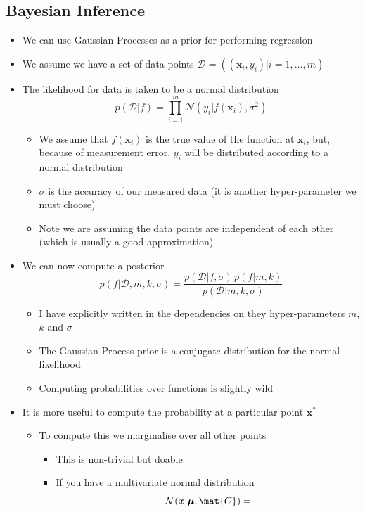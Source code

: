 \documentclass[11pt]{article}
\begin{document}
\subsection{Bayesian Inference}
\label{sec:orgc06d3b0}
\begin{itemize}
\item We can use Gaussian Processes as a prior for performing regression
\item We assume we have a set of data points \(\mathcal{D} = \left( (\bm{x}_i, y_i)
      \big\vert i=1,\ldots, m \right)\)
\item The likelihood for data  is taken to be a normal distribution
$$ p(\mathcal{D}| f) = \prod_{i=1}^m 
      \mathcal{N}\left(y_i \big\vert f(\bm{x}_i), \sigma^2\right) $$
\begin{itemize}
\item We assume that \(f(\bm{x}_i)\) is the true value of the function
at \(\bm{x}_i\), but, because of measurement error, \(y_i\) will be
distributed according to a normal distribution
\item \(\sigma\) is the accuracy of our measured data (it is another
hyper-parameter we must choose)
\item Note we are assuming the data points are independent of each other
(which is usually a good approximation)
\end{itemize}
\item We can now compute a posterior
$$ p(f|\mathcal{D}, m, k, \sigma) = \frac{p(\mathcal{D}| f, \sigma)  \,
     p(f|m,k)}{p(\mathcal{D}|m,k,\sigma)}  $$ 
\begin{itemize}
\item I have explicitly written in the dependencies on they
hyper-parameters \(m\), \(k\) and \(\sigma\)
\item The Gaussian Process prior is a conjugate distribution for the
normal likelihood
\item Computing probabilities over functions is slightly wild
\end{itemize}
\item It is more useful to compute the probability at a particular
point \(\bm{x}^*\)
\begin{itemize}
\item To compute this we marginalise over all other points
\begin{itemize}
\item This is non-trivial but doable
\item If you have a multivariate normal distribution
$$ \mathcal{N}(\bm{x}| \bm{\mu},\mat{C}) =
$$
\end{itemize}
\end{itemize}
\end{itemize}
\end{document}
